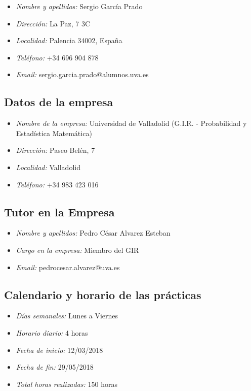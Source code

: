 \documentclass[11pt,a4paper,spanish]{article}
\begin{document}
      \begin{itemize}
        \item \emph{Nombre y apellidos:} Sergio García Prado
        \item \emph{Dirección:} La Paz, 7 3C
        \item \emph{Localidad:} Palencia 34002, España
        \item \emph{Teléfono:} +34 696 904 878
        \item \emph{Email:} sergio.garcia.prado@alumnos.uva.es
      \end{itemize}


    \subsection{Datos de la empresa}

      \begin{itemize}
        \item \emph{Nombre de la empresa:} Universidad de Valladolid (G.I.R. - Probabilidad y Estadística Matemática)
        \item \emph{Dirección:} Paseo Belén, 7
        \item \emph{Localidad:} Valladolid
        \item \emph{Teléfono:} +34 983 423 016
      \end{itemize}


    \subsection{Tutor en la Empresa}

      \begin{itemize}
        \item \emph{Nombre y apellidos:} Pedro César Alvarez Esteban
        \item \emph{Cargo en la empresa:} Miembro del GIR
        \item \emph{Email:} pedrocesar.alvarez@uva.es
      \end{itemize}


    \subsection{Calendario y horario de las prácticas}

      \begin{itemize}
        \item \emph{Días semanales:} Lunes a Viernes
        \item \emph{Horario diario:} 4 horas
        \item \emph{Fecha de inicio:} 12/03/2018
        \item \emph{Fecha de fin:} 29/05/2018
        \item \emph{Total horas realizadas:} 150 horas
      \end{itemize}
\end{document}
